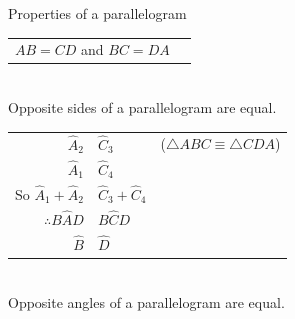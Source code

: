 \begin{wex}{Properties of a parallelogram}
{\begin{tabular}{ll}
$AB = CD$ and $BC = DA$ &  \\ 
\end{tabular} \\ 
Opposite sides of a parallelogram are equal. \\ \newline
\begin{tabular}{r@{=}ll}
 $\hat{A}_{2}$ & $\hat{C}_{3}$ & ($\triangle ABC \equiv \triangle CDA$) \\
$\hat{A}_{1}$ & $\hat{C}_{4}$ & \\
So $\hat{A}_{1} + \hat{A}_{2}$ & $\hat{C}_{3} + \hat{C}_{4}$ & \\
$\therefore B\hat{A}D$ & $B\hat{C}D$ & \\
$\hat{B}$ & $\hat{D}$ & \\
\end{tabular} \\
Opposite angles of a parallelogram are equal.
}
\end{wex}

